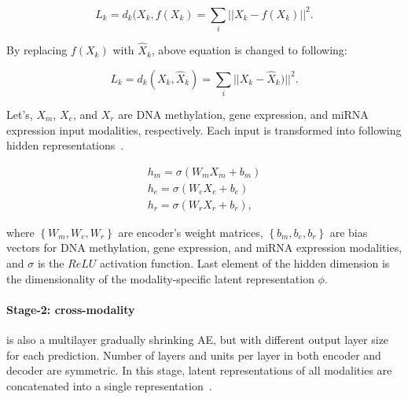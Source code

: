 \begin{equation}
    L_{k}=\text{$d_{k}$}(X_{k}, f(X_{k}) = \sum_{i} ||X_{k}-f(X_{k})||^{2}.
\end{equation}

\hspace*{3.5mm} By replacing $f(X_{k})$ with $\hat{X}_{k}$, above equation is changed to following: 

\begin{equation}
    L_{k}=\text{$d_{k}$}(X_{k}, \hat{X}_{k}) = \sum_{i} ||X_{k}-\hat{X}_{k})||^{2}.
\end{equation}

\hspace*{3.5mm} Let's, $X_m$, $X_e$, and $X_r$ are DNA methylation, gene expression, and miRNA expression input modalities, respectively. Each input is transformed into following hidden representations~\cite{KarimIEEEAccess2019}.

\begin{equation}
    \begin{array}{l}
        {h_{m}=\sigma\left(W_{m} X_{m}+b_{m}\right)} \\
        {h_{e}=\sigma\left(W_{e} X_{e}+b_{e}\right)} \\
        {h_{r}=\sigma\left(W_{r} X_{r}+b_{r}\right),}
    \end{array}
    \label{eq:m1}
\end{equation}  

\hspace*{3.5mm} where $\left\{W_{m}, W_{e}, W_{r}\right\}$ are encoder's weight matrices, $\left\{b_{m}, b_{e}, b_{r}\right\}$ are bias vectors for DNA methylation, gene expression, and miRNA expression modalities, and $\sigma$ is the $ReLU$ activation function. Last element of the hidden dimension is the dimensionality of the modality-specific latent representation $\phi$. %

\paragraph{Stage-2: cross-modality} is also a multilayer gradually shrinking AE, but with different output layer size for each prediction. Number of layers and units per layer in both encoder and decoder are symmetric. In this stage, latent representations of all modalities are concatenated into a single representation~\cite{liu2016multimodal}. 

